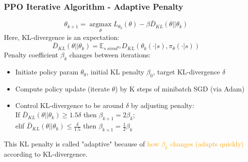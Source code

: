\documentclass{article}
\begin{document}
\begin{thmbox}
    \subsubsection*{PPO Iterative Algorithm - Adaptive Penalty}
    \begin{equation*}
        \theta_{k+1} = \mathop{\arg\max}\limits_{\theta} L_{\theta_k} (\theta) - \beta \bar{D}_{KL} (\theta || \theta_k)
    \end{equation*}
    Here, KL-divergence is an expectation:
    \begin{equation*}
        \bar{D}_{KL} (\theta || \theta_k) = \mathbb{E}_{s \ sim d^{\pi_k}} D_{KL} \left( \theta_{k} (\cdot | s), \pi_{\theta} (\cdot | s) \right)
    \end{equation*}
    Penalty coefficient $\beta_k$ changes between iterations:
    \begin{itemize}
    \item Initiate policy param $\theta_0$, initial KL penalty $\beta_0$, target KL-divergence $\delta$
    \item Compute policy update (iterate $\theta$) by K steps of minibatch SGD (via Adam)
    \item Control KL-divergence to be around $\delta$ by adjusting penalty:
        \\If $\bar{D}_{KL} (\theta || \theta_k) \geq 1.5 \delta$ then $\beta_{k+1} = 2 \beta_{k}$;
        \\elif $\bar{D}_{KL} (\theta || \theta_k) \leq \frac{\delta}{1.5}$ then $\beta_{k+1} = \frac{1}{2} \beta_{k}$
    \end{itemize}
    This KL penalty is called "adaptive" because of \textcolor{orange}{how $\beta_k$ changes (adapts quickly)} according to KL-divergence.
\end{thmbox}
\end{document}
